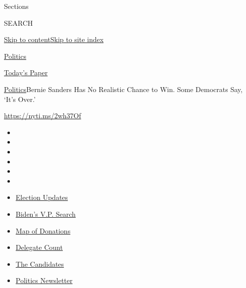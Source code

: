 Sections

SEARCH

\protect\hyperlink{site-content}{Skip to
content}\protect\hyperlink{site-index}{Skip to site index}

\href{https://www.nytimes.com/section/politics}{Politics}

\href{https://myaccount.nytimes.com/auth/login?response_type=cookie\&client_id=vi}{}

\href{https://www.nytimes.com/section/todayspaper}{Today's Paper}

\href{/section/politics}{Politics}\textbar{}Bernie Sanders Has No
Realistic Chance to Win. Some Democrats Say, `It's Over.'

\url{https://nyti.ms/2wh37Of}

\begin{itemize}
\item
\item
\item
\item
\item
\item
\end{itemize}

\begin{itemize}
\item
  \href{https://www.nytimes.com/2020/07/31/us/elections/biden-vs-trump.html?action=click\&pgtype=Article\&state=default\&region=TOP_BANNER\&context=storylines_menu}{Election
  Updates}
\item
  \href{https://www.nytimes.com/article/biden-vice-president-2020.html?action=click\&pgtype=Article\&state=default\&region=TOP_BANNER\&context=storylines_menu}{Biden's
  V.P. Search}
\item
  \href{https://www.nytimes.com/interactive/2020/07/24/us/politics/trump-biden-campaign-donors.html?action=click\&pgtype=Article\&state=default\&region=TOP_BANNER\&context=storylines_menu}{Map
  of Donations}
\item
  \href{https://www.nytimes.com/interactive/2020/us/elections/delegate-count-primary-results.html?action=click\&pgtype=Article\&state=default\&region=TOP_BANNER\&context=storylines_menu}{Delegate
  Count}
\item
  \href{https://www.nytimes.com/interactive/2019/us/politics/2020-presidential-candidates.html?action=click\&pgtype=Article\&state=default\&region=TOP_BANNER\&context=storylines_menu}{The
  Candidates}
\item
  \href{https://www.nytimes.com/newsletters/politics?action=click\&pgtype=Article\&state=default\&region=TOP_BANNER\&context=storylines_menu}{Politics
  Newsletter}
\end{itemize}


